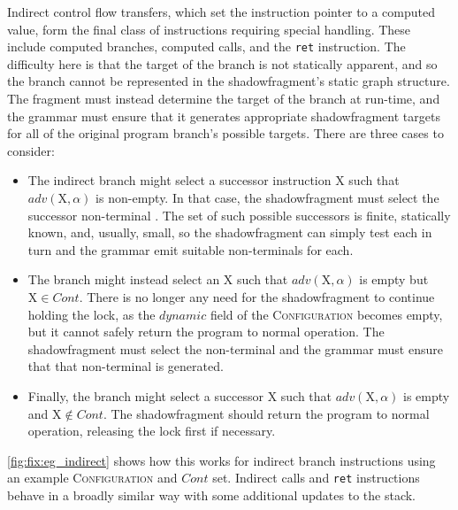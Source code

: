 Indirect control flow transfers, which set the instruction pointer to
a computed value, form the final class of instructions requiring
special handling.  These include computed branches, computed calls,
and the \texttt{ret} instruction.  The difficulty here is that the
target of the branch is not statically apparent, and so the branch
cannot be represented in the \gls{shadowfragment}'s static graph
structure.  The fragment must instead determine the target of the
branch at run-time, and the grammar must ensure that it generates
appropriate \gls{shadowfragment} targets for all of the original
program branch's possible targets.  There are three cases to consider:
\begin{itemize}
\item The indirect branch might select a successor instruction X such
  that $\mathit{adv}(\textrm{X}, \alpha)$ is non-empty.  In that case,
  the \gls{shadowfragment} must select the successor non-terminal
  .  The set of such possible successors is finite,
  statically known, and, usually, small, so the \gls{shadowfragment}
  can simply test each in turn and the grammar emit suitable
  non-terminals for each.
\item The branch might instead select an X such that
  $\mathit{adv}(\textrm{X}, \alpha)$ is empty but $\mathrm{X} \in
  \mathit{Cont}$.  There is no longer any need for the
  \gls{shadowfragment} to continue holding the lock, as the
  $\mathit{dynamic}$ field of the \textsc{Configuration} becomes
  empty, but it cannot safely return the program to normal operation.
  The \gls{shadowfragment} must select the non-terminal  and the grammar must ensure
  that that non-terminal is generated.
\item Finally, the branch might select a successor X such that
  $\mathit{adv}(\textrm{X}, \alpha)$ is empty and $\mathrm{X} \not\in
  \mathit{Cont}$.  The \gls{shadowfragment} should return the program
  to normal operation, releasing the lock first if necessary.
\end{itemize}
\autoref{fig:fix:eg_indirect} shows how this works for indirect branch
instructions using an example \textsc{Configuration} and
$\mathit{Cont}$ set.  Indirect calls and \texttt{ret} instructions
behave in a broadly similar way with some additional updates to the
stack.

